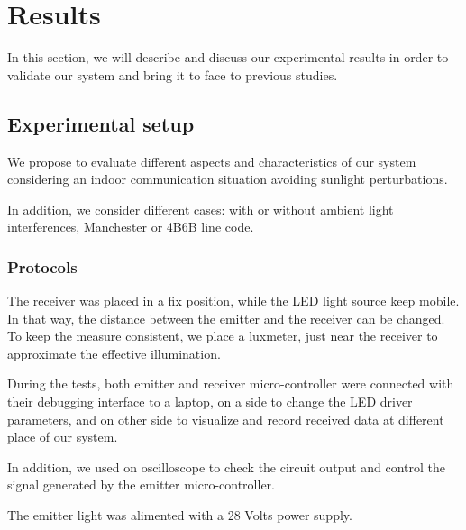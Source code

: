 
\chapter{Results} %

\label{Results} %


In this section, we will describe and discuss our experimental results in order to validate our system and bring it to face to previous studies.
 

\section{Experimental setup}

We propose to evaluate different aspects and characteristics of our system considering an indoor communication situation avoiding sunlight perturbations.

In addition, we consider different cases: with or without ambient light interferences, Manchester or 4B6B line code. 

\subsection{Protocols}

The receiver was placed in a fix position, while the LED light source keep mobile. In that way, the distance between the emitter and the receiver can  be changed. To keep the measure consistent, we place a luxmeter, just near the receiver to approximate the effective illumination.

During the tests, both emitter and receiver micro-controller were connected with their debugging interface to a laptop, on a side to change the LED driver parameters, and on other side to visualize and record received data at different place of our system. 

In addition, we used on oscilloscope to check the circuit output and control the signal generated by the emitter micro-controller.

The emitter light was alimented with a 28 Volts power supply.


